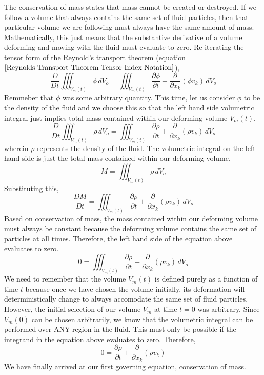 
The conservation of mass states that mass cannot be created or destroyed.
If we follow a volume that always contains the same set of fluid particles, then that particular volume we are following must always have the same amount of mass.
Mathematically, this just means that the substantive derivative of a volume deforming and moving with the fluid must evaluate to zero.
Re-iterating the tensor form of the Reynold's transport theorem (equation $\ref{Reynolds Transport Theorem Tensor Index Notation}$),
$$\frac{D}{Dt}\iiint^{}_{V_{m}(t)} \phi \,dV_{o} = \iiint^{}_{V_{m}(t)} \frac{\partial \phi}{\partial t} + \frac{\partial}{\partial x_{k}} (\phi v_{k}) \,dV_{o}$$
Remmeber that $\phi$ was some arbitrary quantity. 
This time, let us consider $\phi$ to be the density of the fluid and we choose this so that the left hand side volumetric integral just implies total mass contained within our deforming volume $V_{m}(t)$.
$$\frac{D}{Dt}\iiint^{}_{V_{m}(t)} \rho \,dV_{o} = \iiint^{}_{V_{m}(t)} \frac{\partial \rho}{\partial t} + \frac{\partial}{\partial x_{k}} (\rho v_{k}) \,dV_{o}$$
wherein $\rho$ represents the density of the fluid.
The volumetric integral on the left hand side is just the total mass contained within our deforming volume,
$$M = \iiint^{}_{V_{m}(t)} \rho \,dV_{o}$$
Substituting this,
$$\frac{DM}{Dt} = \iiint^{}_{V_{m}(t)} \frac{\partial \rho}{\partial t} + \frac{\partial}{\partial x_{k}} (\rho v_{k}) \,dV_{o}$$
Based on conservation of mass, the mass contained within our deforming volume must always be constant because the deforming volume contains the same set of particles at all times.
Therefore, the left hand side of the equation above evaluates to zero.
$$0 = \iiint^{}_{V_{m}(t)} \frac{\partial \rho}{\partial t} + \frac{\partial}{\partial x_{k}} (\rho v_{k}) \,dV_{o}$$
We need to remember that the volume $V_{m}(t)$ is defined purely as a function of time $t$ because once we have chosen the volume initially, its deformation will deterministically change to always accomodate the same set of fluid particles.
However, the initial selection of our volume $V_{m}$ at time $t = 0$ was arbitrary. 
Since $V_{m}(0)$ can be chosen arbitrarily, we know that the volumetric integral can be performed over ANY region in the fluid.
This must only be possible if the integrand in the equation above evaluates to zero.
Therefore,
\begin{equation}0 = \frac{\partial \rho}{\partial t} + \frac{\partial}{\partial x_{k}} (\rho v_{k}) \label{Governing Equation Fluid Conservation of Mass}\end{equation}
We have finally arrived at our first governing equation, conservation of mass.

